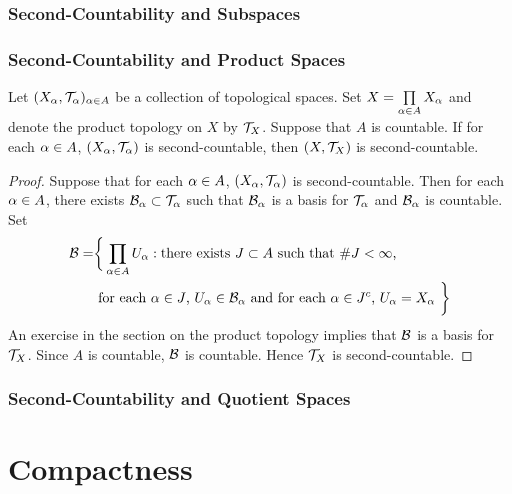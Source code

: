 \documentclass{book}
\begin{document}
	\subsubsection{Second-Countability and Subspaces}
	
	

	\subsubsection{Second-Countability and Product Spaces}
	\begin{ex}
		Let $(X_{\alpha}, \mathcal{T}_{\alpha})_{\alpha \in A}$ be a collection of topological spaces. Set $X = \prod\limits_{\alpha \in A} X_{\alpha}$ and denote the product topology on $X$ by $\mathcal{T}_X$. Suppose that $A$ is countable. If for each $\alpha \in A$, $(X_{\alpha}, \mathcal{T}_{\alpha})$ is second-countable, then $(X, \mathcal{T}_X)$ is second-countable. 
	\end{ex}

	\begin{proof}
		Suppose that for each $\alpha \in A$, $(X_{\alpha}, \mathcal{T}_{\alpha})$ is second-countable. Then for each  $\alpha \in A$, there exists $\mathcal{B}_{\alpha} \subset \mathcal{T}_{\alpha}$ such that $\mathcal{B}_{\alpha}$ is a basis for $\mathcal{T}_{\alpha}$ and $\mathcal{B}_{\alpha}$ is countable. Set 
		\begin{align*}
			\mathcal{B} = 
			& \bigg \{\prod_{\alpha \in A} U_{\alpha}: \text{there exists $J \subset A$ such that $ \# J < \infty$, } \\
			& \text{ for each $\alpha \in J$, $U_{\alpha} \in \mathcal{B}_{\alpha}$ and for each $\alpha \in J^c$, $U_{\alpha} = X_{\alpha}$ } \bigg \}
		\end{align*}  
		An exercise in the section on the product topology implies that $\mathcal{B}$ is a basis for $\mathcal{T}_X$. Since $A$ is countable, $\mathcal{B}$ is countable. Hence $\mathcal{T}_X$ is second-countable. 
	\end{proof}

	\subsubsection{Second-Countability and Quotient Spaces}

	
	
	
	
	
	
	
	
	
	
	
	
	
	
	
	\newpage
	\section{Compactness}
	
\end{document}
